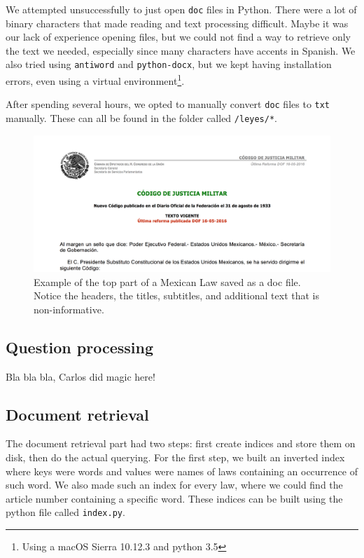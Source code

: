 \documentclass[letterpaper, margin=1in]{article}
\begin{document}
We attempted unsuccessfully to just open \texttt{doc} files in Python. There were a lot of binary characters that made reading and text processing difficult. Maybe it was our lack of experience opening files, but we could not find a way to retrieve only the text we needed, especially since many characters have accents in Spanish. We also tried using \texttt{antiword} and \texttt{python-docx}, but we kept having installation errors, even using a virtual environment\footnote{Using a macOS Sierra 10.12.3 and python 3.5}.

After spending several hours, we opted to manually convert \texttt{doc} files to \texttt{txt} manually. These can all be found in the folder called \texttt{/leyes/*}.

\begin{figure}
\centering
\includegraphics[width=1\textwidth]{header.png}
\caption{\label{fig:header}Example of the top part of a Mexican Law saved as a doc file. Notice the headers, the titles, subtitles, and additional text that is non-informative.}
\end{figure}

\subsection{Question processing}
Bla bla bla, Carlos did magic here!

\subsection{Document retrieval}
The document retrieval part had two steps: first create indices and store them on disk, then do the actual querying. For the first step, we built an inverted index where keys were words and values were names of laws containing an occurrence of such word. We also made such an index for every law, where we could find the article number containing a specific word.  These indices can be built using the python file called \texttt{index.py}. 
\end{document}
